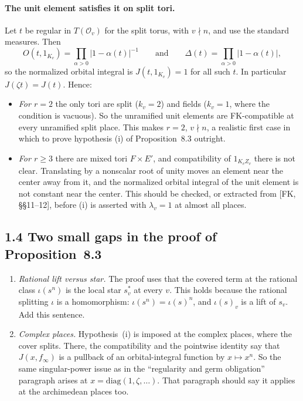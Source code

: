 \documentclass[11pt]{article}
\begin{document}
\paragraph{The unit element satisfies it on split tori.} Let $t$ be
regular in $T(\mathcal O_v)$ for the split torus, with $v\nmid n$, and
use the standard measures. Then
\[
O(t,1_{K_v})=\prod_{\alpha>0}|1-\alpha(t)|^{-1}
\qquad\text{and}\qquad
\Delta(t)=\prod_{\alpha>0}|1-\alpha(t)|,
\]
so the normalized orbital integral is $J(t,1_{K_v})=1$ for all such
$t$. In particular $J(\zeta t)=J(t)$. Hence:
\begin{itemize}
\item \emph{For $r=2$} the only tori are split ($k_v=2$) and fields
($k_v=1$, where the condition is vacuous). So the unramified unit
elements are FK-compatible at every unramified split place. This makes
$r=2$, $v\nmid n$, a realistic first case in which to prove hypothesis
(i) of Proposition~8.3 outright.
\item \emph{For $r\ge3$} there are mixed tori $F\times E'$, and
compatibility of $1_{K_vZ_v}$ there is not clear. Translating by a
nonscalar root of unity moves an element near the center away from it,
and the normalized orbital integral of the unit element is not constant
near the center. This should be checked, or extracted from
[FK, \S\S11--12], before (i) is asserted with $\lambda_v=1$ at almost
all places.
\end{itemize}

\subsection*{1.4 Two small gaps in the proof of Proposition~8.3}
\begin{enumerate}[label=(\alph*)]
\item \emph{Rational lift versus star.} The proof uses that the
covered term at the rational class $\iota(s^n)$ is the local star
$s_v^*$ at every $v$. This holds because the rational splitting $\iota$
is a homomorphism: $\iota(s^n)=\iota(s)^n$, and $\iota(s)_v$ is a lift
of $s_v$. Add this sentence.
\item \emph{Complex places.} Hypothesis~(i) is imposed at the complex
places, where the cover splits. There, the compatibility and the
pointwise identity say that $J(x,f_\infty)$ is a pullback of an
orbital-integral function by $x\mapsto x^n$. So the same
singular-power issue as in the ``regularity and germ obligation''
paragraph arises at $x=\mathrm{diag}(1,\zeta,\ldots)$. That paragraph
should say it applies at the archimedean places too.
\end{enumerate}
\end{document}
